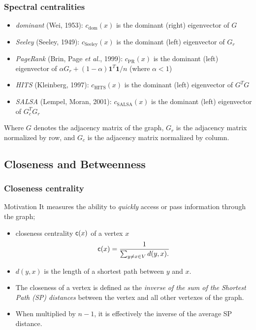 \begin{frame}
  \frametitle{Spectral centralities}
  \begin{itemize}
    \item \emph{dominant} (Wei, 1953):
      $c_{\mathrm{dom}}(x)$ is the dominant (right) eigenvector of $G$
    \item \emph{Seeley} (Seeley, 1949):
      $c_{\mathrm{Seeley}}(x)$ is the dominant (left) eigenvector of $G_r$
    \item \emph{PageRank} (Brin, Page \emph{et al.}, 1999):
      $c_{\mathrm{PR}}(x)$ is the dominant (left) eigenvector of $\alpha
      G_r+(1-\alpha) \mathbf{1}^T\mathbf{1}/n$ (where $\alpha<1$)
    \item \emph{HITS} (Kleinberg, 1997):
      $c_{\mathrm{HITS}}(x)$ is the dominant (left) eigenvector of $G^TG$
    \item \emph{SALSA} (Lempel, Moran, 2001):
      $c_{\mathrm{SALSA}}(x)$ is the dominant (left) eigenvector of $G_c^TG_r$
  \end{itemize}
  \small Where $G$ denotes the adjacency matrix of the graph, $G_r$ is the
  adjacency matrix normalized by row, and $G_c$ is the adjacency matrix
  normalized by column.
\end{frame}

\subsection{Closeness and Betweenness}

\begin{frame}
  \frametitle{Closeness centrality}
  \begin{block}{Motivation}
    It measures the ability to \emph{quickly} access or pass information through
    the graph;
  \end{block}
  \pause
  \begin{definition}
    \begin{itemize}
      \item closeness centrality $\mathsf{c}(x)$ of a vertex $x$
        $$
        \mathsf{c}(x)=\frac{1}{\sum_{y \neq x \in V}d(y,x).}
        $$
      \item $d(y,x)$ is the length of a shortest path between $y$ and $x$.
      \item The closeness of a vertex is defined as the \emph{inverse of the sum
        of the Shortest Path (SP) distances} between the vertex and all other
        vertexes of the graph.
      \item When multiplied by $n-1$, it is effectively the inverse of the
        average SP distance.
    \end{itemize}
  \end{definition}
\end{frame}


